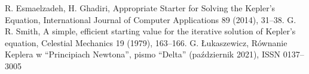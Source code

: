 \documentclass[11pt,wide,leqno]{article}
\begin{document}
    \begin{thebibliography}{2}
        \itemsep2pt
         R. Esmaelzadeh, H. Ghadiri, Appropriate Starter for Solving the
                        Kepler's Equation, International Journal of Computer Applications
                        89 (2014), 31--38.
         G. R. Smith, A simple, efficient starting value for the iterative solution of Kepler's equation,
                    Celestial Mechanics 19 (1979), 163--166.
         G. Łukaszewicz, Równanie Keplera w ``Principiach Newtona'',
                    pismo ``Delta'' (październik 2021), ISSN 0137--3005 
    \end{thebibliography}
\end{document}
